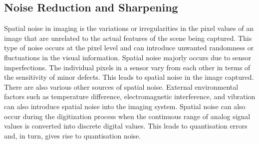 \documentclass[10pt]{article}
\begin{document}
\begin{multicols}{2}
\subsection{Noise Reduction and Sharpening}
Spatial noise in imaging is the variations or irregularities in the pixel values of an image that are unrelated to the actual features of the scene being captured. This type of noise occurs at the pixel level and can introduce unwanted randomness or fluctuations in the visual information.
\newline \newline
Spatial noise majorly occurs due to sensor imperfections. The individual pixels in a sensor vary from each other in terms of the sensitivity of minor defects. This leads to spatial noise in the image captured.
\newline \newline
There are also various other sources of spatial noise. External environmental factors such as temperature difference, electromagnetic interference, and vibration can also introduce spatial noise into the imaging system. Spatial noise can also occur during the digitization process when the continuous range of analog signal values is converted into discrete digital values. This leads to quantisation errors and, in turn, gives rise to quantisation noise.

\end{multicols}
\end{document}
